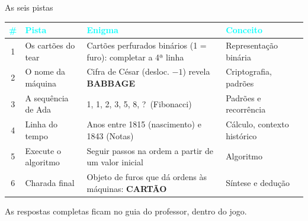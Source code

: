 \documentclass[aspectratio=169, 10pt, t]{beamer}
\newcommand{\muted}[1]{{\color{TextMuted}#1}}
\begin{document}
\begin{frame}{As seis pistas}
  \footnotesize
  \renewcommand{\arraystretch}{1.25}
  \begin{tabularx}{\textwidth}{c l X l}
    \toprule
    \textcolor{Cyan}{\#} & \textcolor{Cyan}{Pista} & \textcolor{Cyan}{Enigma} & \textcolor{Cyan}{Conceito} \\
    \midrule
    1 & Os cartões do tear & Cartões perfurados binários (1 = furo): completar a 4ª linha & Representação binária \\
    2 & O nome da máquina & Cifra de César (desloc. $-1$) revela \textbf{BABBAGE} & Criptografia, padrões \\
    3 & A sequência de Ada & 1, 1, 2, 3, 5, 8, ?\ (Fibonacci) & Padrões e recorrência \\
    4 & Linha do tempo & Anos entre 1815 (nascimento) e 1843 (Notas) & Cálculo, contexto histórico \\
    5 & Execute o algoritmo & Seguir passos na ordem a partir de um valor inicial & Algoritmo \\
    6 & Charada final & Objeto de furos que dá ordens às máquinas: \textbf{CARTÃO} & Síntese e dedução \\
    \bottomrule
  \end{tabularx}
  \vspace{0.5em}

  {\scriptsize\muted{As respostas completas ficam no guia do professor, dentro do jogo.}}
\end{frame}
\end{document}
